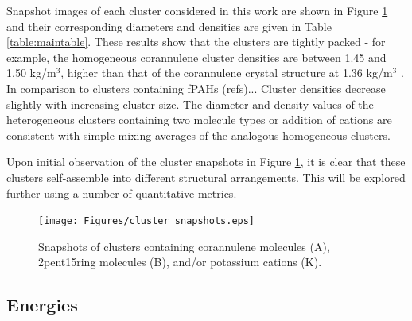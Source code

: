 Snapshot images of each cluster considered in this work are shown in Figure \ref{fig:clustersnapshots} and their corresponding diameters and densities are given in Table \ref{table:maintable}.  %
These results show that the clusters are tightly packed - for example, the homogeneous corannulene cluster densities are between 1.45 and 1.50 kg/$\text{m}^{3}$, higher than that of the corannulene crystal structure at 1.36 kg/$\text{m}^{3}$ \cite{CORANN11unitcell}. In comparison to clusters containing fPAHs (refs)... %
Cluster densities decrease slightly with increasing cluster size.
The diameter and density values of the heterogeneous clusters containing two molecule types or addition of cations are consistent with simple mixing averages of the analogous homogeneous clusters. %


Upon initial observation of the cluster snapshots in Figure \ref{fig:clustersnapshots}, it is clear that these clusters self-assemble into different structural arrangements.  This will be explored further using a number of quantitative metrics.
%
\begin{figure}[!tbh]
\centering
\texttt{[image: Figures/cluster\_snapshots.eps]}
\caption{Snapshots of clusters containing corannulene molecules (A), 2pent15ring molecules (B), and/or potassium cations (K).}
\label{fig:clustersnapshots}
\end{figure}
%

\subsection{Energies}

